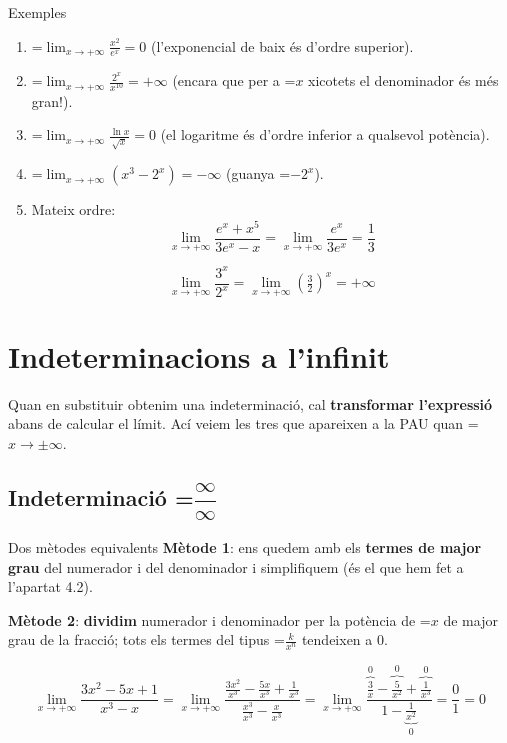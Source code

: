\documentclass[11pt,a4paper]{article}
\newcommand{\fmm}[1]{\setbox0=\hbox{$#1$}\ifdim\wd0>\linewidth\[#1\]\else\mbox{\box0}\fi}
\begin{document}
  
\begin{fmex}{Exemples}
\begin{enumerate}[label=\textbf{\arabic*.},leftmargin=*]
\item \fmm{\displaystyle\lim_{x\to+\infty}\frac{x^2}{e^x}=0} (l'exponencial de baix és d'ordre superior).
\item \fmm{\displaystyle\lim_{x\to+\infty}\frac{2^x}{x^{10}}=+\infty} (encara que per a \fmm{x} xicotets el denominador és més gran!).
\item \fmm{\displaystyle\lim_{x\to+\infty}\frac{\ln x}{\sqrt x}=0} (el logaritme és d'ordre inferior a qualsevol potència).
\item \fmm{\displaystyle\lim_{x\to+\infty}\left(x^3-2^x\right)=-\infty} (guanya \fmm{-2^x}).
\item Mateix ordre: 
\[\lim_{x\to+\infty}\frac{e^x+x^5}{3e^x-x}=\lim_{x\to+\infty}\frac{e^x}{3e^x}=\frac13\]

\[\lim_{x\to+\infty}\frac{3^x}{2^x}=\lim_{x\to+\infty}\left(\tfrac32\right)^x=+\infty\]

\end{enumerate}
\end{fmex}

  
\section{Indeterminacions a l'infinit}\hypertarget{sec4}{}

  
  

Quan en substituir obtenim una indeterminació, cal \textbf{transformar l'expressió} abans de calcular el límit. Ací veiem les tres que apareixen a la PAU quan \fmm{x\to\pm\infty}.

  
\subsection*{Indeterminació \fmm{\dfrac{\infty}{\infty}}}

  
\begin{fmdef}{Dos mètodes equivalents}
\textbf{Mètode 1}: ens quedem amb els \textbf{termes de major grau} del numerador i del denominador i simplifiquem (és el que hem fet a l'apartat 4.2).

      

\textbf{Mètode 2}: \textbf{dividim} numerador i denominador per la potència de \fmm{x} de major grau de la fracció; tots els termes del tipus \fmm{\frac{k}{x^n}} tendeixen a 0.

      
\[\lim_{x\to+\infty}\frac{3x^2-5x+1}{x^3-x}=\lim_{x\to+\infty}\frac{\frac{3x^2}{x^3}-\frac{5x}{x^3}+\frac{1}{x^3}}{\frac{x^3}{x^3}-\frac{x}{x^3}}=\lim_{x\to+\infty}\frac{\overbrace{\tfrac{3}{x}}^{0}-\overbrace{\tfrac{5}{x^2}}^{0}+\overbrace{\tfrac{1}{x^3}}^{0}}{1-\underbrace{\tfrac{1}{x^2}}_{0}}=\frac01=0\]

\end{fmdef}
\end{document}
